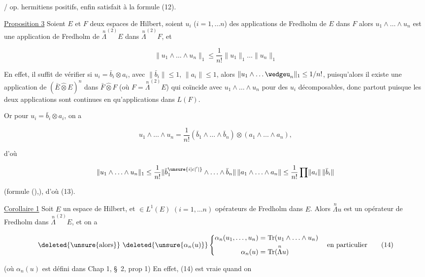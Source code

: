 / op. hermitiens positifs, enfin satisfait à la formule (12).


\uline{Proposition 3} Soient $E$ et $F$ deux espaces de Hilbert, soient $u_i$ ($i=1,\ldots n$) des applications de Fredholm de $E$ dans $F$\unsure{;|,} alors $u_1\wedge\ldots\wedge u_n$ est une application de Fredholm de $\overset{n}{\Lambda}^{(2)}E$ dans $\overset{n}{\Lambda}^{(2)}F$, et

\[
\lVert u_1\wedge\ldots\wedge u_n\rVert_1\leq\frac1{n!}\lVert u_1\rVert_1\ldots\lVert u_n\rVert_1\tag*{(13)}
\]

En effet, il suffit de \deleted{\unsure{$\leq$}} vérifier  si  $u_i=\bar b_i\otimes a_i$,  avec $\lVert\bar b_i\rVert\leq1$, $\lVert a_i\rVert\leq1$, alors $\lVert u_1\wedge\ldots\wedgeu_n\rVert_1\leq1/n!$,  puisqu'alors il existe une application     de $(\bar E\widehat{\otimes}E)^n$ dans  $\bar F\widehat{\otimes}F$ (où $F=\overset{n}{\Lambda}^{(2)}E$) qui coïncide avec  $u_1\wedge\ldots\wedge u_n$ pour des $u_i$ décomposables, donc partout puisque les deux applications sont continues  en  qu'applications dans $L(F)$.

Or pour $u_i=\bar b_i\otimes a_i$, on a 

\[
u_1\wedge\ldots\wedge u_n=\frac1{n!}(\bar b_1\wedge\ldots\wedge\bar b_n)\otimes(a_1\wedge\ldots\wedge a_n),
\]

 d'où

\[
\lVert u_1\wedge\ldots\wedge u_n\rVert_1\leq\frac1{n!}\lVert\bar b_1^{\unsure{i|c|'|{}}}\wedge\ldots\wedge\bar b_n\rVert\,\lVert a_1\wedge\ldots\wedge a_n\rVert\leq\frac1{n!}\prod\lVert a_i\rVert\,\lVert\bar b_i\rVert
\]

(formule (),), d'où (13).

\uline{Corollaire 1} Soit $E$ un espace de Hilbert, et  $\in L^1(E)$  $(i=1,\ldots n)$  opérateurs de Fredholm dans $E$. Alors $\overset{n}{\Lambda}u$ est un opérateur de Fredholm dans $\overset{n}{\Lambda}^{(2)}E$, et on a

\[
\deleted{\unsure{\text{alors}}}\ \deleted{\unsure{\alpha_n(u)}}\left\{\begin{aligned}
\alpha_n(u_1,\ldots,u_n)&=\operatorname{Tr}(u_1\wedge\ldots\wedge u_n)\\
\alpha_n(u)&=\operatorname{Tr}(\overset{n}{\Lambda}u)
\end{aligned}\right.\quad\text{en particulier}\tag*{(14)}
\]

(où $\alpha_n(u)$ est défini dans Chap 1, \S~2, prop 1) En effet, (14) est vraie  quand on
